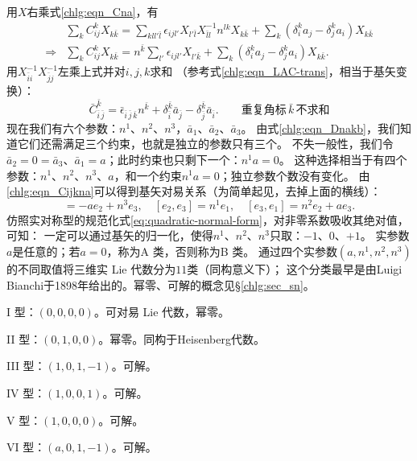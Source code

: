 用$X$右乘式\eqref{chlg:eqn_Cna}，有
\begin{align*}
	&\sum\nolimits_{k} C^k_{ij} X_{k \bar{k}}
	= \sum\nolimits_{kl l'\bar{l}} \epsilon_{ijl'} X_{l' \bar{l}} X^{-1}_{\bar{l}l} n^{lk} X_{k \bar{k}}
	+\sum\nolimits_{k} (\delta^k_i a_j - \delta^k_j a_i ) X_{k \bar{k}} \\
	\Rightarrow & \sum\nolimits_{k} C^k_{ij} X_{k \bar{k}}
	= n^{\bar{k}}  \sum\nolimits_{ l'}  \epsilon_{ijl'}  X_{l' \bar{k}}
	+\sum\nolimits_{k} (\delta^k_i a_j - \delta^k_j a_i ) X_{k \bar{k}} .
\end{align*}
用$X^{-1}_{\bar{i}i}X^{-1}_{\bar{j}j}$左乘上式并对$i,j,k$求和
（参考式\eqref{chlg:eqn_LAC-trans}，相当于基矢变换）：
\begin{equation}\label{chlg:eqn_Cijkna}
		\bar{C}^{\bar{k}}_{\bar{i}\,\bar{j}} = \bar{\epsilon}_{\bar{i}\,\bar{j}\,\bar{k}} n^{\bar{k}}
		+\delta^{\bar{k}}_{\bar{i}} \bar{a}_{\bar{j}} - \delta^{\bar{k}}_{\bar{j}} \bar{a}_{\bar{i}}  .
		\qquad \text{重复角标}\,\bar{k}\,\text{不求和}
\end{equation}
现在我们有六个参数：$n^1$、$n^2$、$n^3$，$\bar{a}_1$、$\bar{a}_2$、$\bar{a}_3$。
由式\eqref{chlg:eqn_Dnakb}，我们知道它们还需满足三个约束，也就是独立的参数只有三个。
不失一般性，我们令$\bar{a}_2=0=\bar{a}_3$、$\bar{a}_1=a$；此时约束也只剩下一个：$n^1 a =0$。
这种选择相当于有四个参数：$n^1$、$n^2$、$n^3$、$a$，和一个约束$n^1 a =0$；独立参数个数没有变化。
由\eqref{chlg:eqn_Cijkna}可以得到基矢对易关系（为简单起见，去掉上面的横线）：
\begin{equation}
	[e_1,e_2]=-a e_2 + n^3 e_3,\quad
	[e_2,e_3]= n^1 e_1,\quad
	[e_3,e_1]=n^2 e_2 + a e_3 .
\end{equation}
仿照实对称型的规范化式\eqref{eq:quadratic-normal-form}，对非零系数吸收其绝对值，可知：
一定可以通过基矢的归一化，使得$n^1$、$n^2$、$n^3$只取：$-1$、$0$、$+1$。
实参数$a$是任意的；若$a=0$，称为{A 类}，否则称为{B 类}。
通过四个实参数$(a,n^1,n^2,n^3)$的不同取值将三维实 Lie 代数分为$11$类（同构意义下）；
这个分类最早是由Luigi Bianchi于1898年给出的。幂零、可解的概念见\S\ref{chlg:sec_sn}。

{I 型}：$(0,0,0,0)$。可对易 Lie 代数，幂零。

{II 型}：$(0,1,0,0)$。幂零。同构于Heisenberg代数。

{III 型}：$(1,0,1,-1)$。可解。

{IV 型}：$(1,0,0,1)$。可解。

{V 型}：$(1,0,0,0)$。可解。

{VI 型}：$(a,0,1,-1)$。可解。

